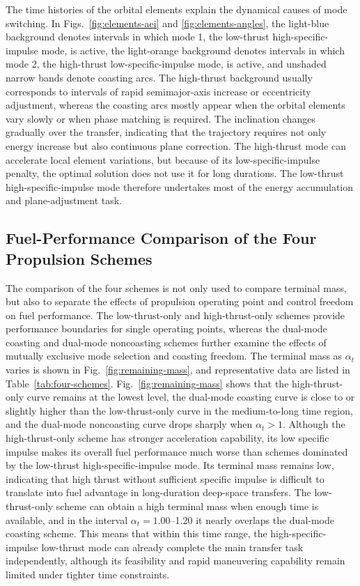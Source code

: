 ﻿\documentclass{IEEEtaes}
\begin{document}
The time histories of the orbital elements explain the dynamical causes of mode switching. In Figs.~\ref{fig:elements-aei} and \ref{fig:elements-angles}, the light-blue background denotes intervals in which mode 1, the low-thrust high-specific-impulse mode, is active, the light-orange background denotes intervals in which mode 2, the high-thrust low-specific-impulse mode, is active, and unshaded narrow bands denote coasting arcs. The high-thrust background usually corresponds to intervals of rapid semimajor-axis increase or eccentricity adjustment, whereas the coasting arcs mostly appear when the orbital elements vary slowly or when phase matching is required. The inclination changes gradually over the transfer, indicating that the trajectory requires not only energy increase but also continuous plane correction. The high-thrust mode can accelerate local element variations, but because of its low-specific-impulse penalty, the optimal solution does not use it for long durations. The low-thrust high-specific-impulse mode therefore undertakes most of the energy accumulation and plane-adjustment task.

\subsection{Fuel-Performance Comparison of the Four Propulsion Schemes}
The comparison of the four schemes is not only used to compare terminal mass, but also to separate the effects of propulsion operating point and control freedom on fuel performance. The low-thrust-only and high-thrust-only schemes provide performance boundaries for single operating points, whereas the dual-mode coasting and dual-mode noncoasting schemes further examine the effects of mutually exclusive mode selection and coasting freedom. The terminal mass as $\alpha_t$ varies is shown in Fig.~\ref{fig:remaining-mass}, and representative data are listed in Table~\ref{tab:four-schemes}. Fig.~\ref{fig:remaining-mass} shows that the high-thrust-only curve remains at the lowest level, the dual-mode coasting curve is close to or slightly higher than the low-thrust-only curve in the medium-to-long time region, and the dual-mode noncoasting curve drops sharply when $\alpha_t>1$. Although the high-thrust-only scheme has stronger acceleration capability, its low specific impulse makes its overall fuel performance much worse than schemes dominated by the low-thrust high-specific-impulse mode. Its terminal mass remains low, indicating that high thrust without sufficient specific impulse is difficult to translate into fuel advantage in long-duration deep-space transfers. The low-thrust-only scheme can obtain a high terminal mass when enough time is available, and in the interval $\alpha_t=1.00$--1.20 it nearly overlaps the dual-mode coasting scheme. This means that within this time range, the high-specific-impulse low-thrust mode can already complete the main transfer task independently, although its feasibility and rapid maneuvering capability remain limited under tighter time constraints.
\end{document}
